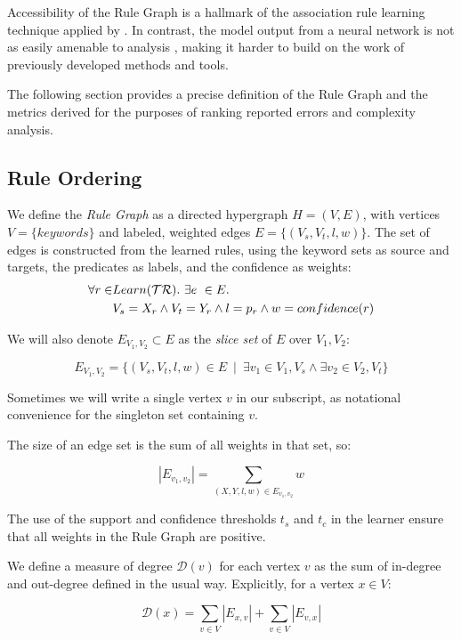 Accessibility of the Rule Graph is a hallmark of the association rule
learning technique applied by \app \cite{someOtherGraphStuff}.
In contrast, the model output from a neural network is not as easily 
amenable to analysis \cite{nnAnalysis1, nnAnalysis2}, making it harder
to build on the work of previously developed methods and tools.

The following section provides a precise definition of the Rule Graph
and the metrics derived for the purposes of ranking reported errors
and complexity analysis.

\subsection{Rule Ordering}
\label{sec:ruleorder}

We define the \textit{Rule Graph} as a directed hypergraph $H = (V,E)$,
   with vertices $V = \{ keywords \}$ and labeled, weighted edges $E = \{ (V_s, V_t, l, w) \}$.
The set of edges is constructed from the learned rules, using the keyword sets as source and targets, the predicates as labels, and the confidence as weights:
%
\begin{align*}
\forall r \in & Learn(\mathcal{TR}).\ \exists e\ \in E.\\
              & V_s = X_r \land V_t=Y_r \land l=p_r \land w = confidence(r)
\end{align*}

We will also denote $E_{V_1, V_2} \subset E$ as the \textit{slice set} of $E$ over $V_1, V_2$: 

    $$E_{V_1, V_2} = \{ \left( V_s, V_t, l, w \right) \in E \ \mid \ \exists v_1 \in V_1, V_s \land \exists v_2 \in V_2, V_t \}$$

Sometimes we will write a single vertex $v$ in our subscript, as
notational convenience for the singleton set containing $v$.

The size of an edge set is the sum of all weights in that set, so:

    $$|E_{v_1, v_2}| = \sum_{(X, Y, l, w) \in E_{v_1, v_2}} w$$

The use of the support and confidence thresholds $t_s$ and $t_c$ in the learner ensure 
that all weights in the Rule Graph are positive.

We define a measure of degree $\mathcal{D}(v)$ for each vertex $v$ as the sum of in-degree
and out-degree defined in the usual way. Explicitly, for a vertex $x \in V$:

    $$\mathcal{D}(x) = \sum_{v \in V} |E_{x, v}| + \sum_{v \in V} |E_{v, x}|$$


